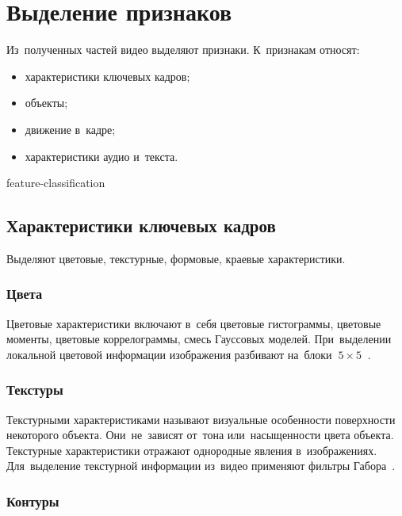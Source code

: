 
\section{Выделение признаков}

Из~полученных частей видео выделяют признаки.
К~признакам относят:
\begin{itemize}
    \item характеристики ключевых кадров;
    \item объекты;
    \item движение в~кадре;
    \item характеристики аудио и~текста.
\end{itemize}


\begin{figuredt}
    {feature-classification}
\end{figuredt}


\subsection{Характеристики ключевых кадров}

Выделяют цветовые, текстурные, формовые, краевые характеристики.

\subsubsection{Цвета}

Цветовые характеристики включают в~себя цветовые гистограммы,
цветовые моменты,
цветовые коррелограммы,
смесь Гауссовых моделей.
При~выделении локальной цветовой информации изображения разбивают
на~блоки $~5 \times 5~$ \cite{Yan:2007}.


\subsubsection{Текстуры}

Текстурными характеристиками называют визуальные особенности поверхности
некоторого объекта. Они~не~зависят от~тона или~насыщенности цвета объекта.
Текстурные характеристики отражают однородные явления в~изображениях.
Для~выделение текстурной информации
из~видео применяют фильтры Габора\ \cite{Adcock:2004}.

\subsubsection{Контуры}

